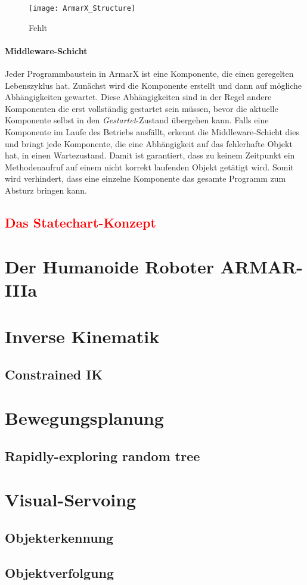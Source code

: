 \begin{figure}[h]
\begin{center}
\texttt{[image: ArmarX\_Structure]}
\caption{Fehlt}
\label{fig:ArmarX_structure}
\end{center}
\end{figure}

\paragraph{Middleware-Schicht} Jeder Programmbaustein in ArmarX ist eine Komponente, die einen geregelten Lebenszyklus hat. Zunächst wird die Komponente erstellt und dann auf mögliche Abhängigkeiten gewartet. Diese Abhängigkeiten sind in der Regel andere Komponenten die erst vollständig gestartet sein müssen, bevor die aktuelle Komponente selbst in den \textit{Gestartet}-Zustand übergehen kann. Falls eine Komponente im Laufe des Betriebs ausfällt, erkennt die Middleware-Schicht dies und bringt jede Komponente, die eine Abhängigkeit auf das fehlerhafte Objekt hat, in einen Wartezustand. Damit ist garantiert, dass zu keinem Zeitpunkt ein Methodenaufruf auf einem nicht korrekt laufenden Objekt getätigt wird. Somit wird verhindert, dass eine einzelne Komponente das gesamte Programm zum Absturz bringen kann.




\subsection{\textcolor{red}{Das Statechart-Konzept}}

\section{Der Humanoide Roboter ARMAR-IIIa}

\section{Inverse Kinematik}\label{sec:InverseKinematik}
\subsection{Constrained IK}\label{sec:ConstrainedIK}

\section{Bewegungsplanung} \label{sec:Bewegungsplanung}
\subsection{Rapidly-exploring random tree}

\section{Visual-Servoing}
\subsection{Objekterkennung}
\subsection{Objektverfolgung}